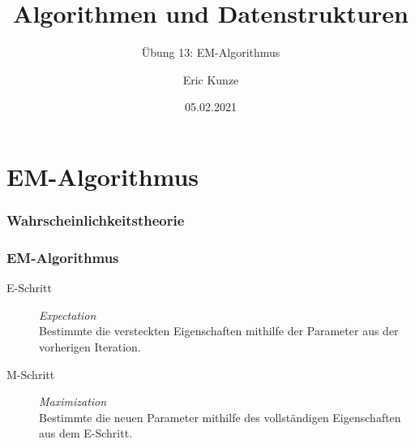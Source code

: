 \documentclass{beamer}
\begin{document}
	
	\title{Algorithmen und Datenstrukturen}
	\subtitle{Übung 13: EM-Algorithmus}
	\author{Eric Kunze}
	\date{05.02.2021}

	\maketitle


\section{EM-Algorithmus}

\begin{frame} \frametitle{Wahrscheinlichkeitstheorie}
	
\end{frame}

\begin{frame} \frametitle{EM-Algorithmus}
	\begin{description}
		\item[E-Schritt] \textit{Expectation} \\
		Bestimmte die versteckten Eigenschaften mithilfe der Parameter aus der vorherigen Iteration.
		\item[M-Schritt] \textit{Maximization} \\
		Bestimmte die neuen Parameter mithilfe des vollständigen Eigenschaften aus dem E-Schritt.
	\end{description}
\end{frame}
\end{document}
